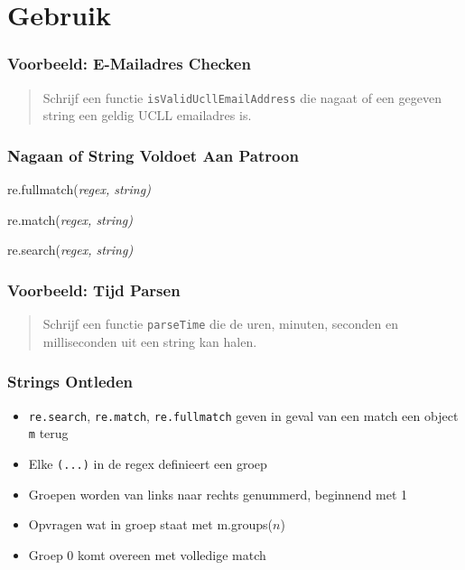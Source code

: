\section{Gebruik}

\frame{\tableofcontents[currentsection]}

\begin{frame}
  \frametitle{Voorbeeld: E-Mailadres Checken}
  \begin{quote}
    Schrijf een functie \texttt{isValidUcllEmailAddress}
    die nagaat of een gegeven string een geldig UCLL emailadres is.
  \end{quote}
\end{frame}

\begin{frame}
  \frametitle{Nagaan of String Voldoet Aan Patroon}
  \begin{center} \ttfamily
    re.fullmatch(\itshape{regex}, \itshape{string})
  \end{center}
  \vskip5mm
  \begin{center} \ttfamily
    re.match(\itshape{regex}, \itshape{string})
  \end{center}
  \vskip5mm
  \begin{center} \ttfamily
    re.search(\itshape{regex}, \itshape{string})
  \end{center}
\end{frame}

\begin{frame}
  \frametitle{Voorbeeld: Tijd Parsen}
  \begin{quote}
    Schrijf een functie \texttt{parseTime} die
    de uren, minuten, seconden en milliseconden uit
    een string kan halen.
  \end{quote}
\end{frame}

\begin{frame}
  \frametitle{Strings Ontleden}
  \begin{itemize}
    \item \texttt{re.search}, \texttt{re.match}, \texttt{re.fullmatch} geven in geval van een match een object \texttt{m} terug
    \item Elke \texttt{(...)} in de regex definieert een groep
    \item Groepen worden van links naar rechts genummerd, beginnend met 1
    \item Opvragen wat in groep staat met {\ttfamily m.groups($n$)}
    \item Groep 0 komt overeen met volledige match
  \end{itemize}
\end{frame}

